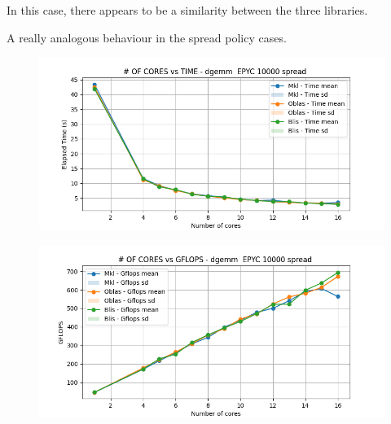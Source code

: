 \documentclass{article}
\begin{document}
In this case, there appears to be a similarity between the three libraries.

A really analogous behaviour in the spread policy cases.
\begin{figure}[H]
    \centering
    \includegraphics[width=\textwidth]{EPYC scalability deep/dgemm__EPYC_10000_spread_time.png}
\end{figure}

\begin{figure}[H]
    \centering
    \includegraphics[width=\textwidth]{EPYC scalability deep/dgemm__EPYC_10000_spread_gflops.png}
\end{figure}



\clearpage %

\printindex
\end{document}

